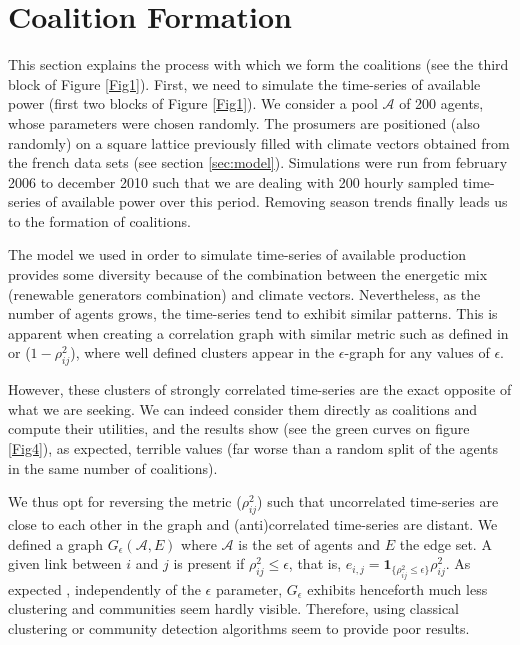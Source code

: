 \documentclass[conference]{IEEEtran}
\begin{document}
%
%

\section{Coalition Formation}
\label{sec:forming}

This section explains the process with which we form the coalitions (see the third block of Figure \ref{Fig1}). First, we need to simulate the time-series of available power (first two blocks of Figure \ref{Fig1}). We consider a pool $ \mathcal{A} $ of 200 agents, whose parameters were chosen randomly. The prosumers are positioned (also randomly) on a square lattice previously filled with climate vectors obtained from the french data sets (see section \ref{sec:model}). Simulations were run from february 2006 to december 2010 such that we are dealing with 200 hourly sampled time-series of available power over this period. Removing season trends finally leads us to the formation of coalitions. 

The model we used in order to simulate time-series of available production provides some diversity because of the combination between the energetic mix (renewable generators combination) and climate vectors. Nevertheless, as the number of agents grows, the time-series tend to exhibit similar patterns. This is apparent when creating a correlation graph with similar metric such as defined in \cite{Garas2008} or \cite{Onnela2004} ($ 1 - \rho_{ij}^{2} $), where well defined clusters appear in the $ \epsilon $-graph for any values of $ \epsilon $. 

However, these clusters of strongly correlated time-series are the exact opposite of what we are seeking. We can indeed consider them directly as coalitions and compute their utilities, and the results show (see the green curves on figure \ref{Fig4}), as expected, terrible values (far worse than a random split of the agents in the same number of coalitions).

We thus opt for reversing the metric ($ \rho_{ij}^{2} $) such that uncorrelated time-series are close to each other in the graph and (anti)correlated time-series are distant. We defined a graph $G_\epsilon(\mathcal{A},E)$ where $\mathcal{A}$ is the set of agents and $ E $ the edge set. A given link between $ i $ and $ j $ is present if $ \rho_{ij}^{2} \leq \epsilon $, that is, $ e_{i,j} = \mathbf{1}_{\{\rho_{ij}^{2} \leq \epsilon \}}\rho_{ij}^{2} $. As expected \cite{Onnela2004}, independently of the $ \epsilon $ parameter, $ G_{\epsilon } $ exhibits henceforth much less clustering and communities seem hardly visible. Therefore, using classical clustering or community detection algorithms seem to provide poor results. 
\end{document}
